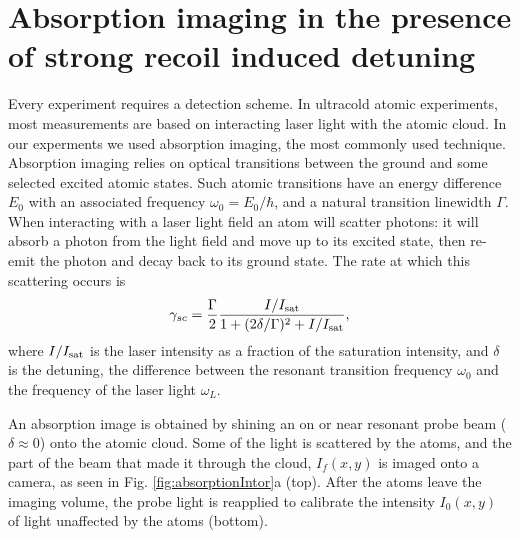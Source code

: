 \documentclass[12pt]{iopart}
\begin{document}
\section{Absorption imaging in the presence of strong recoil induced detuning}
Every experiment requires a detection scheme. In ultracold atomic experiments, most measurements are based on interacting laser light with the atomic cloud. In our experments we used absorption imaging, the most commonly used technique. Absorption imaging relies on optical transitions between the ground and some selected excited atomic states. Such atomic transitions have an energy difference $E_0$ with an associated frequency $\omega_0 = E_0/\hbar$, and a natural transition linewidth $\Gamma$. When interacting with a laser light field an atom will scatter photons: it will absorb a photon from the light field and move up to its excited state,  then re-emit the photon and decay back to its ground state. The  rate at which this scattering occurs is
\begin{equation}
\gamma_{sc}= \frac{\Gamma}{2} \frac{I/I_{\rm{sat}}}{1+(2\delta/\Gamma)^2 +I/I_{\rm{sat}}}, 
\label{eq:scatrate}
\end{equation}
where $I/I_{\rm{sat}}$ is the laser intensity as a fraction of the saturation intensity, and $\delta$ is the detuning, the difference between the resonant transition frequency $\omega_0$ and the frequency of the laser light $\omega_L$.  
\par An absorption image is obtained by shining an on or near resonant probe beam ($\delta\approx0$) onto the atomic cloud. Some of the light is scattered by the atoms, and the part of the beam that made it through the cloud, $I_f(x,y)$ is imaged onto a camera, as seen in Fig. \ref{fig:absorptionIntor}a (top). After the atoms leave the imaging volume, the probe light is reapplied to calibrate the intensity $I_0(x,y)$ of light unaffected by the atoms (bottom). 
\end{document}
